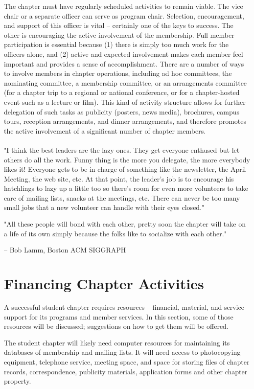 The chapter must have regularly scheduled activities to remain viable. The vice chair or a separate officer can serve as program chair. Selection, encouragement, and support of this officer is vital -- certainly one of the keys to success. The other is encouraging the active involvement of the membership. Full member participation is essential because (1) there is simply too much work for the officers alone, and (2) active and expected involvement makes each member feel important and provides a sense of accomplishment. There are a number of ways to involve members in chapter operations, including ad hoc committees, the nominating committee, a membership committee, or an arrangements committee (for a chapter trip to a regional or national conference, or for a chapter-hosted event such as a lecture or film). This kind of activity structure allows for further delegation of such tasks as publicity (posters, news media), brochures, campus tours, reception arrangements, and dinner arrangements, and therefore promotes the active involvement of a significant number of chapter members.
\\
\\
"I think the best leaders are the lazy ones. They get everyone enthused but let others do all the work. Funny thing is the more you delegate, the more everybody likes it! Everyone gets to be in charge of something like the newsletter, the April Meeting, the web site, etc. At that point, the leader's job is to encourage his hatchlings to lazy up a little too so there's room for even more volunteers to take care of mailing lists, snacks at the meetings, etc. There can never be too many small jobs that a new volunteer can handle with their eyes closed."

"All these people will bond with each other, pretty soon the chapter will take on a life of its own simply because the folks like to socialize with each other."

-- Bob Lamm, Boston ACM SIGGRAPH

\section{Financing Chapter Activities}
\label{sec:sec07}
A successful student chapter requires resources -- financial, material, and service support for its programs and member services. In this section, some of those resources will be discussed; suggestions on how to get them will be offered.

The student chapter will likely need computer resources for maintaining its databases of membership and mailing lists. It will need access to photocopying equipment, telephone service, meeting space, and space for storing files of chapter records, correspondence, publicity materials, application forms and other chapter property.

